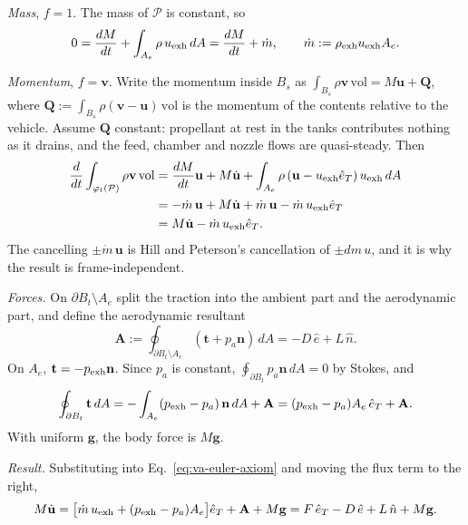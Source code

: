 \emph{Mass}, $f=1$. The mass of $\mathcal P$ is constant, so
\[
 0=\frac{dM}{dt}+\int_{A_e}\rho\,u_{\rm exh}\,dA
 =\frac{dM}{dt}+\dot m,
 \qquad \dot m:=\rho_{\rm exh}u_{\rm exh}A_e .
\]

\emph{Momentum}, $f=\mathbf v$. Write the momentum inside $B_s$ as
$\int_{B_s}\rho\mathbf v\,\mathrm{vol}=M\mathbf u+\mathbf Q$, where
$\mathbf Q:=\int_{B_s}\rho(\mathbf v-\mathbf u)\,\mathrm{vol}$ is the momentum
of the contents relative to the vehicle. Assume $\mathbf Q$ constant:
propellant at rest in the tanks contributes nothing as it drains, and the
feed, chamber and nozzle flows are quasi-steady. Then
\[
\begin{aligned}
 \frac{d}{dt}\int_{\varphi_t(\mathcal P)}\rho\mathbf v\,\mathrm{vol}
 &=\frac{dM}{dt}\mathbf u+M\dot{\mathbf u}
   +\int_{A_e}\rho\,(\mathbf u-u_{\rm exh}\hat e_T)\,u_{\rm exh}\,dA\\
 &=-\dot m\,\mathbf u+M\dot{\mathbf u}
   +\dot m\,\mathbf u-\dot m\,u_{\rm exh}\hat e_T\\
 &=M\dot{\mathbf u}-\dot m\,u_{\rm exh}\hat e_T .
\end{aligned}
\]
The cancelling $\pm\dot m\,\mathbf u$ is Hill and Peterson's cancellation of
$\pm dm\,u$, and it is why the result is frame-independent.

\emph{Forces.} On $\partial B_t\setminus A_e$ split the traction into the
ambient part and the aerodynamic part, and define the aerodynamic resultant
\[
 \mathbf A:=\oint_{\partial B_t\setminus A_e}(\mathbf t+p_a\mathbf n)\,dA
 =-D\,\hat e+L\,\hat n .
\]
On $A_e$, $\mathbf t=-p_{\rm exh}\mathbf n$. Since $p_a$ is constant,
$\oint_{\partial B_t}p_a\mathbf n\,dA=0$ by Stokes, and
\[
 \oint_{\partial B_t}\mathbf t\,dA
 =-\int_{A_e}(p_{\rm exh}-p_a)\,\mathbf n\,dA+\mathbf A
 =(p_{\rm exh}-p_a)A_e\,\hat e_T+\mathbf A .
\]
With uniform $\mathbf g$, the body force is $M\mathbf g$.

\emph{Result.} Substituting into Eq.~\ref{eq:va-euler-axiom} and moving the
flux term to the right,
\begin{equation}\label{eq:va-vector}
 M\dot{\mathbf u}
 =\bigl[\dot m\,u_{\rm exh}+(p_{\rm exh}-p_a)A_e\bigr]\hat e_T
  +\mathbf A+M\mathbf g
 =F\,\hat e_T-D\,\hat e+L\,\hat n+M\mathbf g .
\end{equation}


